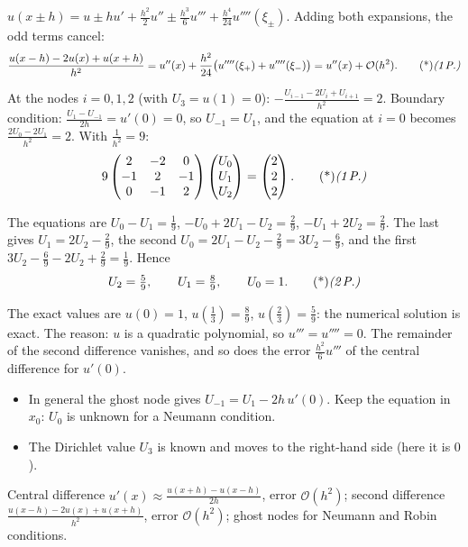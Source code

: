 \begin{solution}
 $u(x\pm h)=u\pm hu'+\frac{h^2}2u''\pm\frac{h^3}6u'''+\frac{h^4}{24}u''''(\xi_\pm)$. Adding both expansions, the odd terms cancel: 
\[
\frac{u(x-h)-2u(x)+u(x+h)}{h^2}=u''(x)+\frac{h^2}{24}\big(u''''(\xi_+)+u''''(\xi_-)\big)=u''(x)+\mathcal O(h^2).\ptd{1}
\]

 At the nodes $i=0,1,2$ (with $U_3=u(1)=0$): $-\frac{U_{i-1}-2U_i+U_{i+1}}{h^2}=2$. 
Boundary condition: $\frac{U_1-U_{-1}}{2h}=u'(0)=0$, so $U_{-1}=U_1$, and the equation at $i=0$ becomes $\frac{2U_0-2U_1}{h^2}=2$. 
With $\frac1{h^2}=9$:
\[
9\begin{pmatrix}2&-2&0\\-1&2&-1\\0&-1&2\end{pmatrix}\begin{pmatrix}U_0\\U_1\\U_2\end{pmatrix}=\begin{pmatrix}2\\2\\2\end{pmatrix}.\ptd{1}
\]

 The equations are $U_0-U_1=\frac19$, $-U_0+2U_1-U_2=\frac29$, $-U_1+2U_2=\frac29$. 
The last gives $U_1=2U_2-\frac29$, the second $U_0=2U_1-U_2-\frac29=3U_2-\frac69$, and the first $3U_2-\frac69-2U_2+\frac29=\frac19$. Hence
\[
U_2=\tfrac59,\qquad U_1=\tfrac89,\qquad U_0=1.\ptd{2}
\]

 The exact values are $u(0)=1$, $u(\frac13)=\frac89$, $u(\frac23)=\frac59$: the numerical solution is exact. 
The reason: $u$ is a quadratic polynomial, so $u'''=u''''=0$. The remainder of the second difference vanishes, and so does the error $\frac{h^2}6u'''$ of the central difference for $u'(0)$. 

\begin{trap}
\begin{itemize}
\item In general the ghost node gives $U_{-1}=U_1-2h\,u'(0)$. Keep the equation in $x_0$: $U_0$ is unknown for a Neumann condition.
\item The Dirichlet value $U_3$ is known and moves to the right-hand side (here it is $0$).
\end{itemize}
\end{trap}
\begin{heart}
Central difference $u'(x)\approx\frac{u(x+h)-u(x-h)}{2h}$, error $\mathcal O(h^2)$; second difference $\frac{u(x-h)-2u(x)+u(x+h)}{h^2}$, error $\mathcal O(h^2)$; ghost nodes for Neumann and Robin conditions.
\end{heart}
\end{solution}

